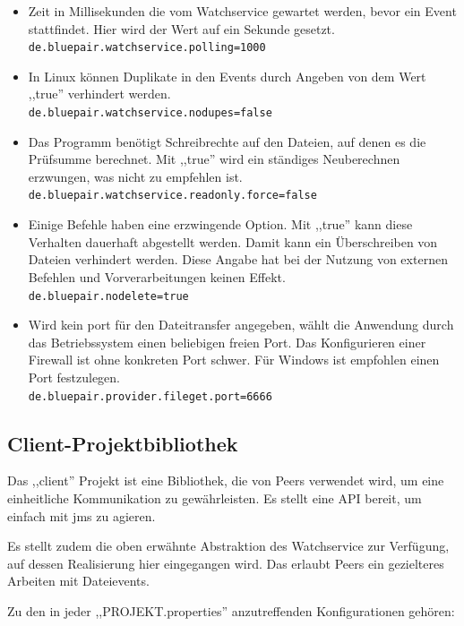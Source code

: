 \documentclass[oneside, ngerman, toc=bibliography,bibliography=totoc,listof=entryprefix, open=right,numbers=noenddot,fontsize=12pt]{scrbook}
\begin{document}
\begin{itemize}
    \item Zeit in Millisekunden die vom Watchservice gewartet werden, bevor ein Event stattfindet. Hier wird der Wert auf ein Sekunde gesetzt.\\ \verb|de.bluepair.watchservice.polling=1000|

\item In Linux können Duplikate in den Events durch Angeben von dem Wert ,,true'' verhindert werden. \\
\verb|de.bluepair.watchservice.nodupes=false|

\item Das Programm benötigt Schreibrechte auf den Dateien, auf denen es die  Prüfsumme berechnet. Mit ,,true'' wird ein ständiges Neuberechnen erzwungen, was nicht zu empfehlen ist.\\
\verb|de.bluepair.watchservice.readonly.force=false|

\item Einige Befehle haben eine erzwingende Option.
Mit ,,true'' kann diese Verhalten dauerhaft abgestellt werden.
Damit kann ein Überschreiben von Dateien verhindert werden. Diese Angabe hat bei der Nutzung von externen Befehlen und Vorverarbeitungen  keinen Effekt.\\
\verb|de.bluepair.nodelete=true|

\item Wird kein port für den Dateitransfer angegeben, wählt die Anwendung durch das Betriebssystem einen beliebigen freien Port. Das Konfigurieren einer Firewall ist ohne konkreten Port schwer. Für Windows ist empfohlen einen Port festzulegen.\\
\verb|de.bluepair.provider.fileget.port=6666|
\end{itemize}

\subsection{Client-Projektbibliothek}

Das ,,client'' Projekt ist eine Bibliothek, die von Peers verwendet wird, um eine einheitliche Kommunikation zu gewährleisten. Es stellt eine API bereit, um einfach mit \acrshort{jms} zu agieren.

Es stellt zudem die oben erwähnte Abstraktion des Watchservice zur Verfügung, auf dessen Realisierung hier eingegangen wird. Das erlaubt Peers ein gezielteres Arbeiten mit Dateievents.

Zu den in jeder ,,PROJEKT.properties'' anzutreffenden Konfigurationen gehören:
\end{document}
